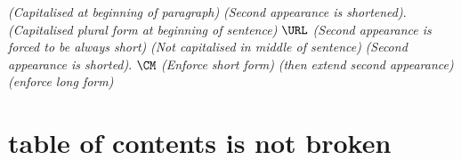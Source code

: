 \documentclass{article}
\begin{document}
\PDF \emph{(Capitalised at beginning of paragraph)}
\PDF \emph{(Second appearance is shortened)}.
\URLs \emph{(Capitalised plural form at beginning of sentence)}
$\URL$ \emph{(Second appearance is forced to be always short)}
\LM \emph{(Not capitalised in middle of sentence)}
\LM \emph{(Second appearance is shorted)}.
$\CM$ \emph{(Enforce short form)}
\CM \emph{(then extend second appearance)}
\URLlong \emph{(enforce long form)}

\section{\PDFlong table of contents is not broken}
\end{document}
